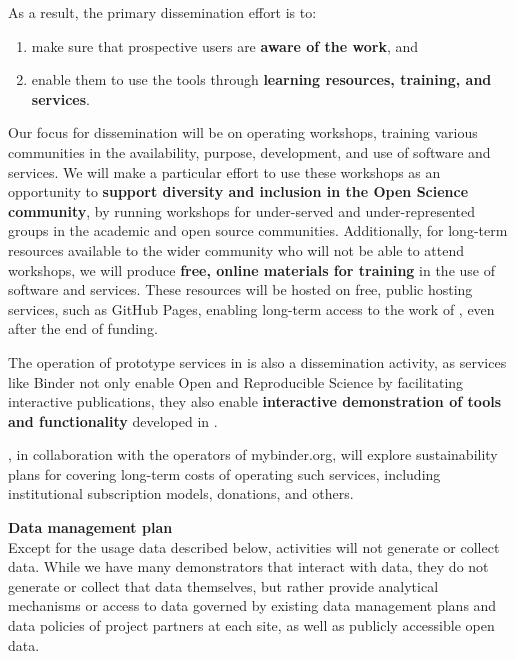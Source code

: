 As a result, the primary dissemination effort is to:

\begin{enumerate}
  \item make sure that prospective users are \textbf{aware of the work}, and
  \item enable them to use the tools through \textbf{learning resources, training, and services}.
\end{enumerate}

Our focus for dissemination will be on
operating workshops, training various communities in the availability,
purpose, development, and use of \TheProject software and services.
We will make a particular effort to use these workshops as an opportunity
to \textbf{support diversity and inclusion in the Open Science community},
by running workshops for under-served and under-represented groups in the academic and
open source communities.
Additionally, for long-term resources available to the wider community
who will not be able to attend workshops,
we will produce \textbf{free, online materials for training} in the use of \TheProject
software and services.
These resources will be hosted on free, public hosting services,
such as GitHub Pages,
enabling long-term access to the work of \TheProject,
even after the end of funding.

The operation of prototype services in  is also a dissemination activity,
as services like Binder not only enable Open and Reproducible Science by facilitating interactive publications,
they also enable \textbf{interactive demonstration of tools and functionality}
developed in \TheProject.

\TheProject, in collaboration with the operators of mybinder.org,
will explore sustainability plans for covering long-term costs of operating such services,
including institutional subscription models, donations, and others.

\medskip
\noindent \textbf{Data management plan}\label{sec:data-management-plan}\\
Except for the usage data described below,
\TheProject activities will not generate or collect data.
While we have many demonstrators that interact with data, they do not generate or collect that
data themselves, but rather provide analytical mechanisms or access to data governed by
existing data management plans and data policies of project partners at each site,
as well as publicly accessible open data.


